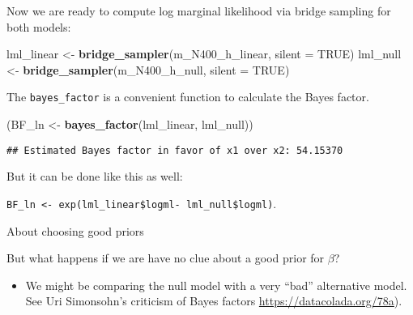 \documentclass[12pt,ignorenonframetext,aspectratio=169]{beamer}
\newenvironment{Shaded}{\begin{snugshade}}{\end{snugshade}}
\newcommand{\DataTypeTok}[1]{\textcolor[rgb]{0.13,0.29,0.53}{#1}}
\newcommand{\KeywordTok}[1]{\textcolor[rgb]{0.13,0.29,0.53}{\textbf{#1}}}
\newcommand{\NormalTok}[1]{#1}
\newcommand{\OtherTok}[1]{\textcolor[rgb]{0.56,0.35,0.01}{#1}}
\newcommand{\StringTok}[1]{\textcolor[rgb]{0.31,0.60,0.02}{#1}}
\providecommand{\tightlist}{%
  \setlength{\itemsep}{0pt}\setlength{\parskip}{0pt}}
\begin{document}
\begin{frame}[fragile]

Now we are ready to compute log marginal likelihood via bridge sampling for both models:
\footnotesize
\vspace{1cm}

\begin{Shaded}
\begin{Highlighting}[]
\NormalTok{lml_linear <-}\StringTok{ }\KeywordTok{bridge_sampler}\NormalTok{(m_N400_h_linear, }\DataTypeTok{silent =} \OtherTok{TRUE}\NormalTok{)}
\NormalTok{lml_null <-}\StringTok{ }\KeywordTok{bridge_sampler}\NormalTok{(m_N400_h_null, }\DataTypeTok{silent =} \OtherTok{TRUE}\NormalTok{)}
\end{Highlighting}
\end{Shaded}

\end{frame}

\begin{frame}[fragile]

The \texttt{bayes\_factor} is a convenient function to calculate the Bayes factor.

\small
\vspace{1cm}

\begin{Shaded}
\begin{Highlighting}[]
\NormalTok{(BF_ln <-}\StringTok{ }\KeywordTok{bayes_factor}\NormalTok{(lml_linear, lml_null))}
\end{Highlighting}
\end{Shaded}

\begin{verbatim}
## Estimated Bayes factor in favor of x1 over x2: 54.15370
\end{verbatim}

\vspace{2cm}

But it can be done like this as well:

\texttt{BF\_ln\ \textless{}-\ exp(lml\_linear\$logml-\ lml\_null\$logml)}.

\end{frame}

\begin{frame}{About choosing good priors}
\protect\hypertarget{about-choosing-good-priors}{}

But what happens if we are have no clue about a good prior for \(\beta\)?

\begin{itemize}
\tightlist
\item
  We might be comparing the null model with a very ``bad'' alternative model. See Uri Simonsohn's criticism of Bayes factors \url{https://datacolada.org/78a}).
\end{itemize}

\end{frame}
\end{document}

